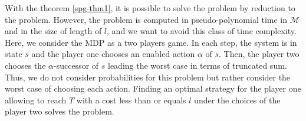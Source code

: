 With the theorem \ref{spg-thm1}, it is possible to solve the \SPG{} problem by reduction to the \SSPP{} problem.
However, the \SSPP{} problem is computed in pseudo-polynomial time in $\mathcal{M}$ and in the size of length of $l$, and we want to avoid this class of time complexity.
Here, we consider the MDP as a two players game.
In each step, the system is in state $s$ and the player one chooses an enabled action $\alpha$ of $s$.
Then, the player two chooses the $\alpha$-successor of $s$ leading the worst case in terms of truncated sum.
Thus, we do not consider probabilities for this problem but rather consider the worst case of choosing each action.
Finding an optimal strategy for the player one allowing to reach $T$ with a cost less than or equals $l$
under the choices of the player two solves the \SPG{} problem. \\

